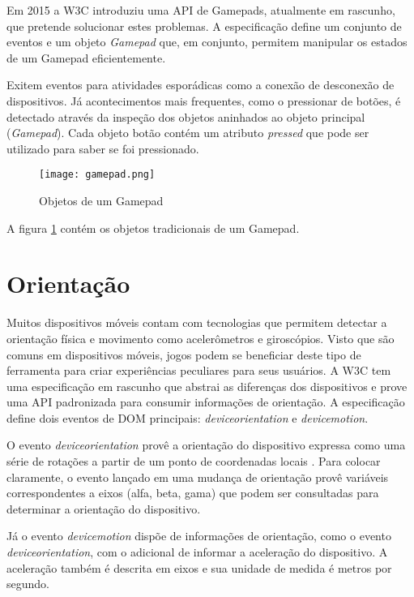 Em 2015 a W3C introduziu uma API de Gamepads, atualmente em rascunho,
que pretende solucionar estes problemas. A especificação define um
conjunto de eventos e um objeto \textit{Gamepad} que, em conjunto,
permitem manipular os estados de um Gamepad eficientemente.

Exitem eventos para atividades esporádicas como a conexão de
desconexão de dispositivos. Já acontecimentos mais frequentes, como o
pressionar de botões, é detectado através da inspeção dos objetos
aninhados ao objeto principal (\textit{Gamepad}). Cada objeto botão contém um 
atributo \textit{pressed} que pode ser utilizado para saber se foi pressionado.

\begin{figure}[H]
    \centering
    \texttt{[image: gamepad.png]}
    \caption{Objetos de um Gamepad}
    \label{fig:gamepad}
\end{figure}

A figura \ref{fig:gamepad} contém os objetos tradicionais de um Gamepad.

\section{Orientação}
Muitos dispositivos móveis contam com tecnologias que permitem detectar
a orientação física e movimento como acelerômetros e giroscópios.
Visto que são comuns em dispositivos móveis, jogos podem se beneficiar
deste tipo de ferramenta para criar experiências peculiares para seus
usuários. A W3C tem uma especificação em rascunho que abstrai as
diferenças dos dispositivos e prove uma API padronizada para consumir
informações de orientação. A especificação define dois eventos de
DOM principais: \textit{deviceorientation} e \textit{devicemotion}.

O evento \textit{deviceorientation} provê a orientação do
dispositivo expressa como uma série de rotações a partir de um
ponto de coordenadas locais \autocite{orientationSpec}. Para colocar
claramente, o evento lançado em uma mudança de orientação provê
variáveis correspondentes a eixos (alfa, beta, gama) que podem ser
consultadas para determinar a orientação do dispositivo.

Já o evento \textit{devicemotion} dispõe de informações de
orientação, como o evento \textit{deviceorientation}, com o adicional
de informar a aceleração do dispositivo. A aceleração também é
descrita em eixos e sua unidade de medida é metros por segundo.

